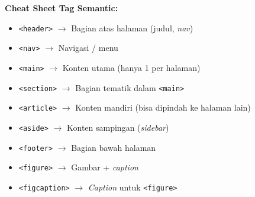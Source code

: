 \begin{tip}
\textbf{Cheat Sheet Tag Semantic:}
\begin{itemize}
  \item \texttt{<header>} $\rightarrow$ Bagian atas halaman (judul, \emph{nav})
  \item \texttt{<nav>} $\rightarrow$ Navigasi / menu
  \item \texttt{<main>} $\rightarrow$ Konten utama (hanya 1 per halaman)
  \item \texttt{<section>} $\rightarrow$ Bagian tematik dalam \texttt{<main>}
  \item \texttt{<article>} $\rightarrow$ Konten mandiri (bisa dipindah ke halaman lain)
  \item \texttt{<aside>} $\rightarrow$ Konten sampingan (\emph{sidebar})
  \item \texttt{<footer>} $\rightarrow$ Bagian bawah halaman
  \item \texttt{<figure>} $\rightarrow$ Gambar + \emph{caption}
  \item \texttt{<figcaption>} $\rightarrow$ \emph{Caption} untuk \texttt{<figure>}
\end{itemize}
\end{tip}